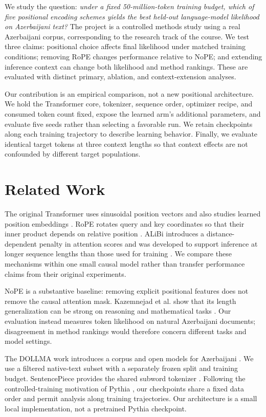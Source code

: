 \documentclass[conference]{IEEEtran}
\begin{document}
We study the question: \emph{under a fixed 50-million-token training budget, which of five positional encoding schemes yields the best held-out language-model likelihood on Azerbaijani text?} The project is a controlled methods study using a real Azerbaijani corpus, corresponding to the research track of the course. We test three claims: positional choice affects final likelihood under matched training conditions; removing RoPE changes performance relative to NoPE; and extending inference context can change both likelihood and method rankings. These are evaluated with distinct primary, ablation, and context-extension analyses.

Our contribution is an empirical comparison, not a new positional architecture. We hold the Transformer core, tokenizer, sequence order, optimizer recipe, and consumed token count fixed, expose the learned arm's additional parameters, and evaluate five seeds rather than selecting a favorable run. We retain checkpoints along each training trajectory to describe learning behavior. Finally, we evaluate identical target tokens at three context lengths so that context effects are not confounded by different target populations.

\section{Related Work}
The original Transformer uses sinusoidal position vectors and also studies learned position embeddings \cite{vaswani}. RoPE rotates query and key coordinates so that their inner product depends on relative position \cite{su}. ALiBi introduces a distance-dependent penalty in attention scores and was developed to support inference at longer sequence lengths than those used for training \cite{press}. We compare these mechanisms within one small causal model rather than transfer performance claims from their original experiments.

NoPE is a substantive baseline: removing explicit positional features does not remove the causal attention mask. Kazemnejad et al. show that its length generalization can be strong on reasoning and mathematical tasks \cite{kazemnejad}. Our evaluation instead measures token likelihood on natural Azerbaijani documents; disagreement in method rankings would therefore concern different tasks and model settings.

The DOLLMA work introduces a corpus and open models for Azerbaijani \cite{isbarov}. We use a filtered native-text subset with a separately frozen split and training budget. SentencePiece provides the shared subword tokenizer \cite{kudo}. Following the controlled-training motivation of Pythia \cite{biderman}, our checkpoints share a fixed data order and permit analysis along training trajectories. Our architecture is a small local implementation, not a pretrained Pythia checkpoint.
\end{document}

